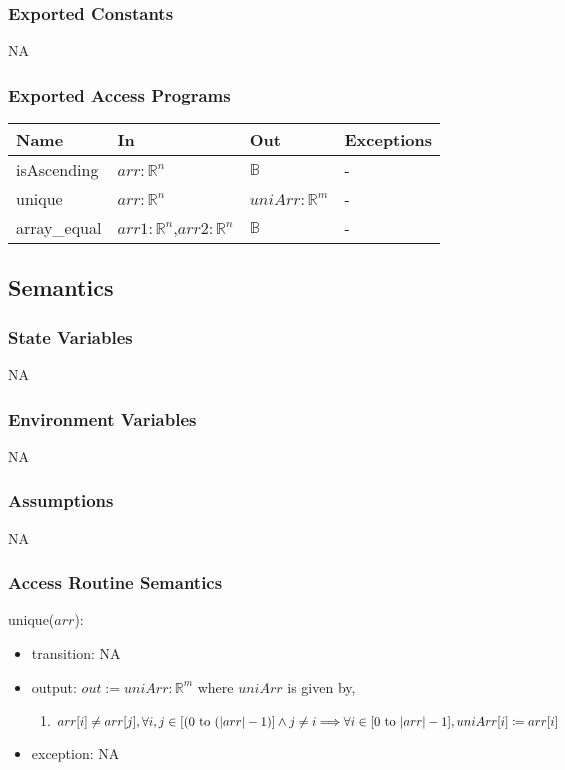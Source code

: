 \documentclass[12pt, titlepage]{article}
\begin{document}
\subsubsection{Exported Constants}
NA
\subsubsection{Exported Access Programs}

\begin{center}
	\begin{tabular}{p{2cm} p{4cm} p{4cm} p{2cm}}
		\hline
		\textbf{Name} & \textbf{In} & \textbf{Out} & \textbf{Exceptions} \\
		\hline
		isAscending & $arr: \mathbb{R}^n$ & $\mathbb{B}$ & -\\
		unique & $arr: \mathbb{R}^n$ & $uniArr: \mathbb{R}^m$ & -\\
		array\_equal & $arr1: \mathbb{R}^n$,$arr2: \mathbb{R}^n$ & $\mathbb{B}$ 
		& - \\ 
		\hline
	\end{tabular}
\end{center}

\subsection{Semantics}

\subsubsection{State Variables}

NA

\subsubsection{Environment Variables}

NA
\subsubsection{Assumptions}

NA

\subsubsection{Access Routine Semantics}

\noindent unique($arr$):
\begin{itemize}
	\item transition: NA
	\item output: $out := uniArr: \mathbb{R}^m$ where $uniArr$ is given by,
	\begin{enumerate}
	\item $arr[i]\neq arr[j],\forall i,j \in [(0\ \text{to}\ (|arr|-1)] \land 
	j \neq i \Longrightarrow\\ \forall i\in[0\ \text{to}\ |arr|-1], uniArr[i] 
	\coloneqq arr[i]$
	\end{enumerate}
	
	\item exception: NA
\end{itemize}
\end{document}
